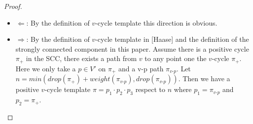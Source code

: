 \documentclass{article}
\newtheorem{proof}{\textit{Proof}}
\begin{document}
\begin{proof}
\begin{itemize}
\item $\Leftarrow$: By the definition of $v$-cycle template this direction is obvious.                                                                                                                                                                                                                                                                                                                                                                                                                                                                        
                                                                                                                                                                                                                                                                                                                                                                                                                                                                                                                                                        
\item $\Rightarrow$:                                                                                                                                                                                                                                                                                                                                                                                                                                                                                                                                          
By the definition of $v$-cycle template in [Haase] and the definition of the strongly connected component in this paper. Assume there is a positive cycle $\pi_+$ in the SCC, there exists a path from $v$ to any point one the $v$-cycle $\pi_+$. Here we only take a $p\in V'$ on $\pi_+$ and a v-p path $\pi_{v\text{-}p}$. Let $n = min(drop(\pi_+) + weight(\pi_{v\text{-}p}), drop(\pi_{v\text{-}p}))$. Then we have a positive $v$-cycle template $\pi = p_1\cdot p_2 \cdot p_3$ respect to $n$ where $p_1 = \pi_{v\text{-}p}$ and $p_2 = \pi_+$.

\end{itemize}
\end{proof}
\end{document}
